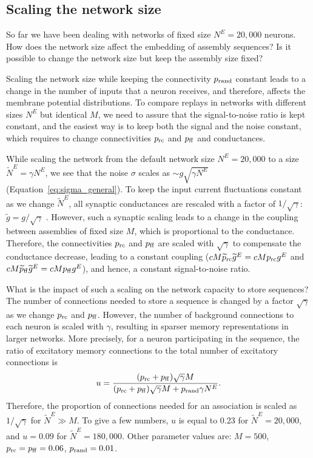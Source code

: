   \subsection{Scaling the network size}
  \label{sec:asss_resize}
    So far we have been dealing with networks of fixed size $N^E=20,000$
    neurons. How does the network size affect the embedding of assembly
    sequences? Is it possible to change the network size but keep the assembly
    size fixed?

    Scaling the network size while keeping the connectivity $p_{\rm rand}$
    constant leads to a change in the number of inputs that a neuron receives,
    and therefore, affects the membrane potential distributions.  To compare
    replays in networks with different sizes $N^E$ but identical $M$, we need
    to assure that the signal-to-noise ratio is kept constant, and the easiest
    way is to keep both the signal and the noise constant, which requires to
    change connectivities $p_{\rm rc}$ and $p_{\rm ff}$ and conductances.
    
    While scaling the network from the default network size $N^E=20,000$ to a
    size $\widetilde{N}^E=\gamma N^E$, we see that the noise $\sigma$ scales as
    $ \sim g \sqrt{\gamma N^E}$ (Equation~\ref{eq:sigma_general}). To keep the input
    current fluctuations constant as we change $\widetilde{N}^E$, all synaptic
    conductances are rescaled with a factor of $1/\sqrt{\gamma}$:
    $\widetilde{g}=g/\sqrt{\gamma}$ \citep{vanVreeswijk1996}. However, such a
    synaptic scaling leads to a change in the coupling between assemblies of
    fixed size $M$, which is proportional to the conductance. Therefore, the
    connectivities $p_{\rm rc}$ and $p_{\rm ff}$ are scaled with
    $\sqrt{\gamma}$ to compensate the conductance decrease, leading to a
    constant coupling ($cM\widetilde{p}_{\rm rc}\widetilde{g}^E = cMp_{\rm
    rc}g^E$ and $cM\widetilde{p}_{\rm ff}\widetilde{g}^E = cMp_{\rm ff}g^E$),
    and hence, a constant signal-to-noise ratio.

    What is the impact of such a scaling on the network capacity to store
    sequences? The number of connections needed to store a sequence is changed
    by a factor $\sqrt{\gamma}$ as we change $p_{\rm rc}$ and $p_{\rm ff}$.
    However, the number of background connections to each neuron is scaled with
    $\gamma$, resulting in sparser memory representations in larger networks.
    More precisely, for a neuron participating in the sequence, the ratio of
    excitatory memory connections to the total number of excitatory connections
    is 
    \[
      u=\frac{(p_{\rm rc}+p_{\rm ff})\sqrt{\gamma}M}{(p_{\rm rc}+p_{\rm ff})\sqrt{\gamma}M + p_{\rm rand} \gamma N^E } . 
    \]
    Therefore, the proportion of connections needed for an association is
    scaled as $1/\sqrt{\gamma}$ for $\widetilde{N}^E \gg M$. To give a few
    numbers, $u$ is equal to 0.23 for $\widetilde{N}^E=20,000$, and $u=0.09$
    for $\widetilde{N}^E = 180,000$. Other parameter values are: $M=500$,
    $p_{\rm rc}=p_{\rm ff}=0.06$, $p_{\rm rand}=0.01$.

